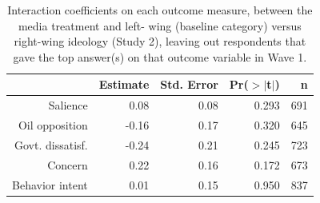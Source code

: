\begin{table}[ht]
\centering
\caption{Interaction coefficients on each outcome measure, between the media treatment and left-
                      wing (baseline category) versus right-wing ideology (Study 2),
                      leaving out respondents that gave the top answer(s) on that outcome variable in Wave 1.} 
\label{tab:disruption_noceiling_ideo2}
\begin{tabular}{rrrrr}
  \hline
 & Estimate & Std. Error & Pr($>$$|$t$|$) & n \\ 
  \hline
Salience & 0.08 & 0.08 & 0.293 & 691 \\ 
  Oil opposition & -0.16 & 0.17 & 0.320 & 645 \\ 
  Govt. dissatisf. & -0.24 & 0.21 & 0.245 & 723 \\ 
  Concern & 0.22 & 0.16 & 0.172 & 673 \\ 
  Behavior intent & 0.01 & 0.15 & 0.950 & 837 \\ 
   \hline
\end{tabular}
\end{table}
